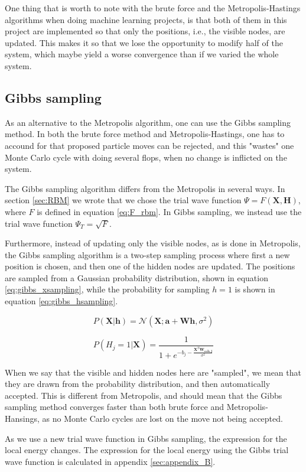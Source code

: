 \documentclass[norsk,a4paper,12pt]{article}
\begin{document}
One thing that is worth to note with the brute force and the Metropolis-Hastings algorithms when doing machine learning projects, is that both of them in this project are implemented so that only the positions, i.e., the visible nodes, are updated. This makes it so that we lose the opportunity to modify half of the system, which maybe yield a worse convergence than if we varied the whole system.


\subsection{Gibbs sampling}
As an alternative to the Metropolis algorithm, one can use the Gibbs sampling method. In both the brute force method and Metropolis-Hastings, one has to accound for that proposed particle moves can be rejected, and this "wastes" one Monte Carlo cycle with doing several flops, when no change is inflicted on the system. \par 
\vspace{3mm}
The Gibbs sampling algorithm differs from the Metropolis in several ways. In section \ref{sec:RBM} we wrote that we chose the trial wave function $\Psi = F(\boldsymbol{X},\boldsymbol{H})$, where $F$ is defined in equation \ref{eq:F_rbm}. In Gibbs sampling, we instead use the trial wave function $\Psi_T = \sqrt{F}$. 
\par 
\vspace{3mm}
Furthermore, instead of updating only the visible nodes, as is done in Metropolis, the Gibbs sampling algorithm is a two-step sampling process where first a new position is chosen, and then one of the hidden nodes are updated. The positions are sampled from a Gaussian probability distribution, shown in equation \ref{eq:gibbs_xsampling}, while the probability for sampling $h=1$ is shown in equation \ref{eq:gibbs_hsampling}.

\begin{equation}
\label{eq:gibbs_xsampling}
P(\boldsymbol{X} | \boldsymbol{h}) = \mathcal{N}(\boldsymbol{X}; \boldsymbol{a} + \boldsymbol{W} \boldsymbol{h}, \sigma^2)
\end{equation}

\begin{equation}
\label{eq:gibbs_hsampling}
P(H_j = 1 | \boldsymbol{X}) = \frac{1}{ 1 + e^{- b_j - \frac{\boldsymbol{X}^T \boldsymbol{W_{cols,j}} }{\sigma^2}}}
\end{equation}

When we say that the visible and hidden nodes here are "sampled", we mean that they are drawn from the probability distribution, and then automatically accepted. This is different from Metropolis, and should mean that the Gibbs sampling method converges faster than both brute force and Metropolis-Hansings, as no Monte Carlo cycles are lost on the move not being accepted. \par 
\vspace{3mm}
As we use a new trial wave function in Gibbs sampling, the expression for the local energy changes. The expression for the local energy using the Gibbs trial wave function is calculated in appendix \ref{sec:appendix_B}.
\end{document}
